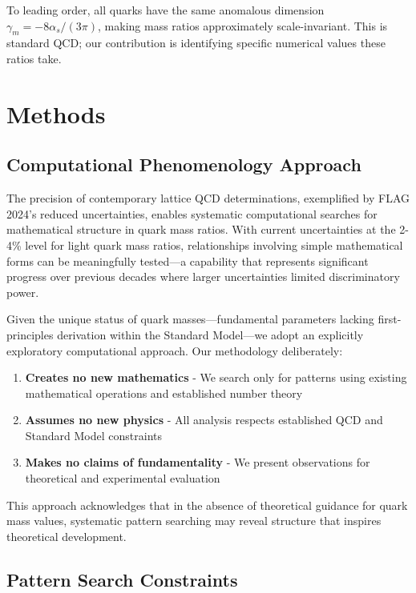 \documentclass[12pt]{article}
\begin{document}
To leading order, all quarks have the same anomalous dimension $\gamma_m = -8\alpha_s/(3\pi)$, making mass ratios approximately scale-invariant. This is standard QCD; our contribution is identifying specific numerical values these ratios take.

\section{Methods}

\subsection{Computational Phenomenology Approach}

The precision of contemporary lattice QCD determinations, exemplified by FLAG 2024's reduced uncertainties, enables systematic computational searches for mathematical structure in quark mass ratios. With current uncertainties at the 2-4\% level for light quark mass ratios, relationships involving simple mathematical forms can be meaningfully tested—a capability that represents significant progress over previous decades where larger uncertainties limited discriminatory power.

Given the unique status of quark masses—fundamental parameters lacking first-principles derivation within the Standard Model—we adopt an explicitly exploratory computational approach. Our methodology deliberately:

\begin{enumerate}
\item \textbf{Creates no new mathematics} - We search only for patterns using existing mathematical operations and established number theory
\item \textbf{Assumes no new physics} - All analysis respects established QCD and Standard Model constraints
\item \textbf{Makes no claims of fundamentality} - We present observations for theoretical and experimental evaluation
\end{enumerate}

This approach acknowledges that in the absence of theoretical guidance for quark mass values, systematic pattern searching may reveal structure that inspires theoretical development.

\subsection{Pattern Search Constraints}
\end{document}
